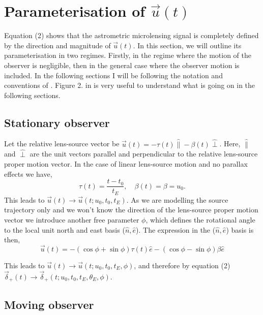 \documentclass[11pt]{article}
\begin{document}
\section{Parameterisation of $\vec{u}(t)$}
%
Equation (2) shows that the astrometric microlensing signal is completely
defined by the direction and magnitude of $\vec{u}(t)$. In this section, we will outline
its parameterisation in two regimes. Firstly, in the regime where the motion of the observer
is negligible, then in the general case where the observer motion is included. In the 
following sections I will be following the notation and conventions of \cite{Gould04}.
Figure 2. in \cite{Gould04} is very useful to understand what is going on in the 
following sections.

\subsection{Stationary observer}

Let the relative lens-source vector be $\vec{u}(t) = -\tau(t)\hat{\parallel}-\beta(t)\hat{\perp}$.
Here, $\hat{\parallel}$ and $\hat{\perp}$ are the unit vectors parallel and perpendicular to
the relative lens-source proper motion vector.  In the case
of linear lens-source motion and no parallax effects we have,
%
\begin{equation}
\tau(t) = \frac{t-t_{0}}{t_{E}}, \quad \beta(t) = \beta
        = u_{0}.
\end{equation}
%
This leads to $\vec{u}(t) \to \vec{u}(t;u_{0},t_{0},t_{E})$. As we are modelling the source
trajectory only and we won't know the direction of the lens-source proper motion vector 
we introduce another free parameter $\phi$, which defines the rotational angle to 
the local unit north and east basis ($\hat{n},\hat{e}$). The expression in the 
($\hat{n},\hat{e}$) basis is then,
%
\begin{equation}
\vec{u}(t) = -(\cos\phi+\sin\phi)\tau(t)\hat{e} - (\cos\phi-\sin\phi)\beta\hat{e}
\end{equation}

This leads to 
$\vec{u}(t) \to \vec{u}(t;u_{0},t_{0},t_{E},\phi)$, and therefore
by equation (2) $\vec{\delta}_{+}(t) \to \vec{\delta}_{+}(t;u_{0},t_{0},t_{E},\theta_{E},\phi)$.

\subsection{Moving observer}
\end{document}
